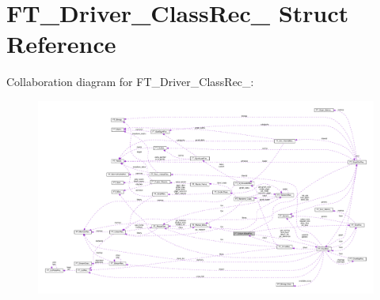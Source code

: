 \hypertarget{structFT__Driver__ClassRec__}{}\section{F\+T\+\_\+\+Driver\+\_\+\+Class\+Rec\+\_\+ Struct Reference}
\label{structFT__Driver__ClassRec__}


Collaboration diagram for F\+T\+\_\+\+Driver\+\_\+\+Class\+Rec\+\_\+\+:
\nopagebreak
\begin{figure}[H]
\begin{center}
\leavevmode
\includegraphics[width=350pt]{structFT__Driver__ClassRec____coll__graph}
\end{center}
\end{figure}
